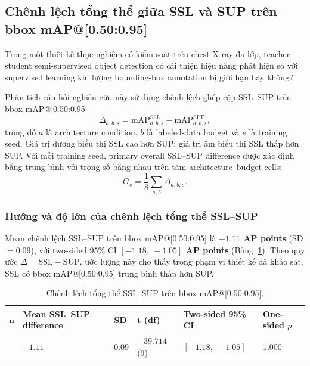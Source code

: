 \documentclass[pdflatex,sn-mathphys-num]{sn-jnl}%
\theoremstyle{thmstyleone}%
\theoremstyle{thmstyletwo}%
\theoremstyle{thmstylethree}%
\begin{document}
\subsection{Chênh lệch tổng thể giữa SSL và SUP trên bbox mAP@[0.50:0.95]}
\label{sec:results_main_rq}

Trong một thiết kế thực nghiệm có kiểm soát trên chest X-ray đa lớp, teacher--student semi-supervised object detection có cải thiện hiệu năng phát hiện so với supervised learning khi lượng bounding-box annotation bị giới hạn hay không?

Phân tích câu hỏi nghiên cứu này sử dụng chênh lệch ghép cặp SSL--SUP trên bbox mAP@[0.50:0.95]
\begin{equation}
\Delta_{a,b,s}
=
\mathrm{mAP}^{\mathrm{SSL}}_{a,b,s}
-
\mathrm{mAP}^{\mathrm{SUP}}_{a,b,s},
\label{eq:results_paired_delta}
\end{equation}
trong đó $a$ là architecture condition, $b$ là labeled-data budget và $s$ là training seed. Giá trị dương biểu thị SSL cao hơn SUP; giá trị âm biểu thị SSL thấp hơn SUP. Với mỗi training seed, primary overall SSL--SUP difference được xác định bằng trung bình với trọng số bằng nhau trên tám architecture--budget cells:
\begin{equation}
G_s=\frac{1}{8}\sum_{a,b}\Delta_{a,b,s}.
\label{eq:results_overall_seed_effect}
\end{equation}

\subsubsection{Hướng và độ lớn của chênh lệch tổng thể SSL--SUP}

Mean chênh lệch SSL--SUP trên bbox mAP@[0.50:0.95] là \textbf{$-1.11$ AP points} (SD $=0.09$), với two-sided 95\% CI \textbf{$[-1.18,\ -1.05]$ AP points} (Bảng~\ref{tab:main_rq_primary}). Theo quy ước $\Delta=\mathrm{SSL}-\mathrm{SUP}$, ước lượng này cho thấy trong phạm vi thiết kế đã khảo sát, SSL có bbox mAP@[0.50:0.95] trung bình thấp hơn SUP.

\begin{table}[htbp]
\centering
\caption{Chênh lệch tổng thể SSL--SUP trên bbox mAP@[0.50:0.95].}
\label{tab:main_rq_primary}

\small
\setlength{\tabcolsep}{3pt}
\renewcommand{\arraystretch}{1.08}

\begin{tabularx}{\linewidth}{
>{\centering\arraybackslash}p{0.7cm}
>{\centering\arraybackslash}X
>{\centering\arraybackslash}p{0.9cm}
>{\centering\arraybackslash}p{1.5cm}
>{\centering\arraybackslash}X
>{\centering\arraybackslash}p{1.5cm}
}
\toprule

\(\boldsymbol{n}\) &
\textbf{Mean SSL--SUP difference} &
\textbf{SD} &
\(\boldsymbol{t}\)\textbf{ (df)} &
\textbf{Two-sided 95\% CI} &
\textbf{One-sided \(p\)} \\

\midrule

10 &
$-1.11$ &
$0.09$ &
$-39.714$ (9) &
$[-1.18,\,-1.05]$ &
$1.000$ \\

\bottomrule
\end{tabularx}
\end{table}
\end{document}
